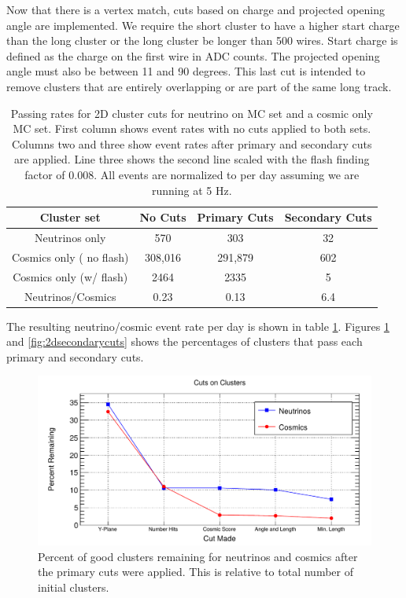 Now that there is a vertex match, cuts based on charge and projected opening angle are implemented. We require the short cluster to have a higher start charge than the long cluster or the long cluster be longer than 500 wires. Start charge is defined as the charge on the first wire in ADC counts. The projected opening angle must also be between 11 and 90 degrees. This last cut is intended to remove clusters that are entirely overlapping or are part of the same long track. 
\begin{table}
\begin{center}
\begin{tabular}{c c c c}
\hline
Cluster set & No Cuts & Primary Cuts & Secondary Cuts \\
\hline
Neutrinos only & 570 & 303 & 32 \\
Cosmics only ( no flash) & 308,016 & 291,879 & 602 \\
Cosmics only (w/ flash) & 2464 & 2335 & 5 \\
\hline
Neutrinos/Cosmics & 0.23 & 0.13 & 6.4 \\
\end{tabular}
\caption{Passing rates for 2D cluster cuts for neutrino on MC set and a cosmic only MC set. First column shows event rates with no cuts applied to both sets. Columns two and three show event rates after primary and secondary cuts are applied. Line three shows the second line scaled with the flash finding factor of 0.008. All events are normalized to per day assuming we are running at 5 Hz.}
\label{table:eventrate}
\end{center}
\end{table}
The resulting neutrino/cosmic event rate per day is shown in table \ref{table:eventrate}. Figures \ref{fig:2dprimarycut} and \ref{fig:2dsecondarycuts} shows the percentages of clusters that pass each primary and secondary cuts.     

\begin{figure}[htp!]
\centering
\includegraphics[width=\textwidth]{figs/2dprimarycut.png}
\caption{Percent of good clusters remaining for neutrinos and cosmics after the primary cuts were applied. This is relative to total number of initial clusters.}
\label{fig:2dprimarycut}
\end{figure}

